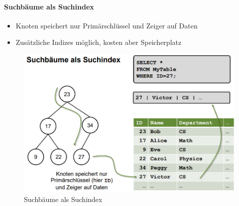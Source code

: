 \documentclass[
    ngerman,
    color=3b,
    load_common, %
    summary,
    boxarc,
]{tuda_summary}
\begin{document}
\paragraph{Suchbäume als Suchindex}
\begin{itemize}
    \item Knoten speichert nur Primärschlüssel und Zeiger auf Daten
    \item Zusätzliche Indizes möglich, kosten aber Speicherplatz
\end{itemize}
\begin{figure}[ht]
    \centering
    \includegraphics[width=12cm]{pictures/suchbaumSuchindex.PNG}
    \caption{Suchbäume als Suchindex}
\end{figure}
\clearpage
\end{document}
